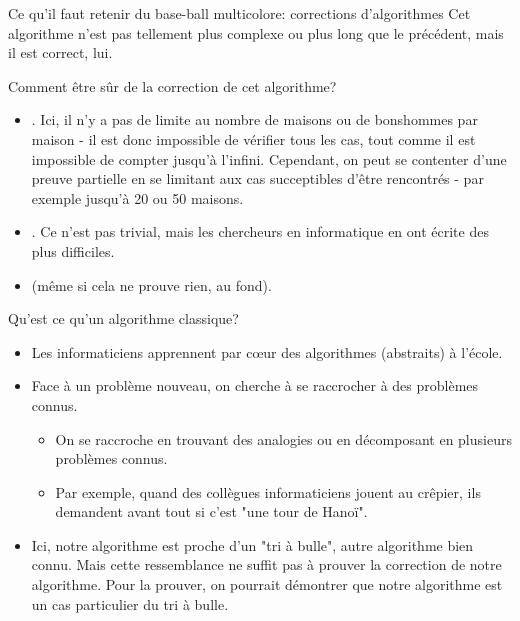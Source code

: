 \begin{frame}{Ce qu'il faut retenir du base-ball multicolore: corrections d'algorithmes}
  Cet algorithme n'est pas tellement plus complexe ou plus long que le
  précédent, mais il est correct, lui.

  \begin{block}{Comment être sûr de la \alert{correction} de cet algorithme?}
    \begin{itemize}
    \item {}. Ici, il n'y a pas de limite au nombre de maisons ou de bonshommes par maison - il est donc impossible de vérifier tous les cas, tout comme il est impossible de compter jusqu'à l'infini. Cependant, on peut se contenter d'une preuve partielle en se limitant aux cas succeptibles d'être rencontrés - par exemple jusqu'à 20 ou 50 maisons.
    \item {}. Ce n'est pas trivial, mais les chercheurs en informatique en ont écrite des plus difficiles.
    \item {} (même si cela ne prouve rien, au fond).
    \end{itemize}
  \end{block}

  \begin{block}{Qu'est ce qu'un \alert{algorithme classique}?}
    \begin{itemize}
    \item Les informaticiens apprennent par cœur des algorithmes (abstraits) à l'école.
    \item Face à un problème nouveau, on cherche à se raccrocher à des problèmes connus.
      \begin{itemize}
      \item On se raccroche en trouvant des analogies ou en décomposant en plusieurs problèmes connus.
      \item Par exemple, quand des collègues informaticiens jouent au crêpier, ils demandent avant tout si c'est "une tour de Hanoï".
      \end{itemize}
    \item Ici, notre algorithme est proche d'un "tri à bulle", autre algorithme bien connu. Mais cette ressemblance ne suffit pas à prouver la correction de notre algorithme. Pour la prouver, on pourrait démontrer que notre algorithme est un cas particulier du tri à bulle.
    \end{itemize}
  \end{block}


\end{frame}

